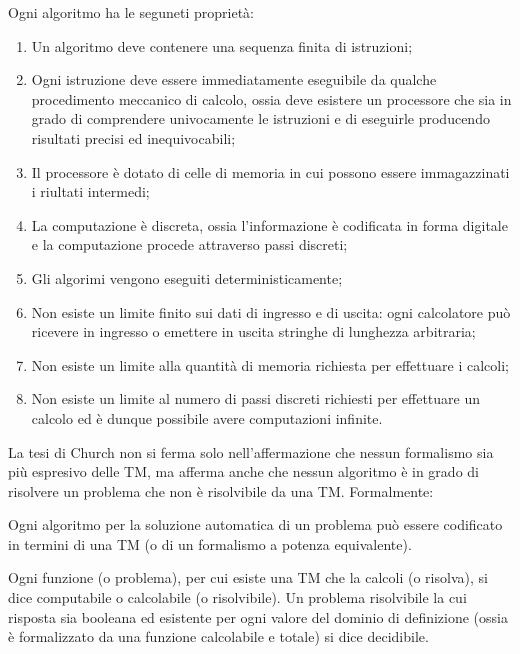   Ogni algoritmo ha le seguneti proprietà:
  \begin{enumerate}
    \item Un algoritmo deve contenere una sequenza finita di istruzioni;
    \item Ogni istruzione deve essere immediatamente eseguibile da qualche procedimento meccanico di calcolo, ossia deve esistere un processore che sia in grado di comprendere univocamente le istruzioni e di eseguirle producendo risultati precisi ed inequivocabili;
    \item Il processore è dotato di celle di memoria in cui possono essere immagazzinati i riultati intermedi;
    \item La computazione è discreta, ossia l'informazione è codificata in forma digitale e la computazione procede attraverso passi discreti;
    \item Gli algorimi vengono eseguiti deterministicamente;
    \item Non esiste un limite finito sui dati di ingresso e di uscita: ogni calcolatore può ricevere in ingresso o emettere in uscita stringhe di lunghezza arbitraria;
    \item Non esiste un limite alla quantità di memoria richiesta per effettuare i calcoli;
    \item Non esiste un limite al numero di passi discreti richiesti per effettuare un calcolo ed è dunque possibile avere computazioni infinite.
  \end{enumerate}

  La tesi di Church non si ferma solo nell'affermazione che nessun formalismo sia più espresivo delle TM, ma afferma anche che nessun algoritmo è in grado di risolvere un problema che non è risolvibile da una TM. Formalmente:

  \begin{thesis}
    Ogni algoritmo per la soluzione automatica di un problema può essere codificato in termini di una TM (o di un formalismo a potenza equivalente).
  \end{thesis}

  \begin{theorem}
    Ogni funzione (o problema), per cui esiste una TM che la calcoli (o risolva), si dice computabile o calcolabile (o risolvibile). Un problema risolvibile la cui risposta sia booleana ed esistente per ogni valore del dominio di definizione (ossia è formalizzato da una funzione calcolabile e totale) si dice decidibile.
  \end{theorem}

